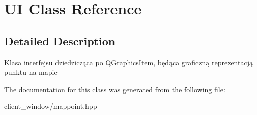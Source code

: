 \hypertarget{classUI}{}\section{UI Class Reference}
\label{classUI}


\subsection{Detailed Description}
Klasa interfejsu dziedzicząca po Q\+Graphics\+Item, będąca graficzną reprezentacją punktu na mapie 

The documentation for this class was generated from the following file\+:\begin{DoxyCompactItemize}
\item 
client\+\_\+window/mappoint.\+hpp\end{DoxyCompactItemize}

